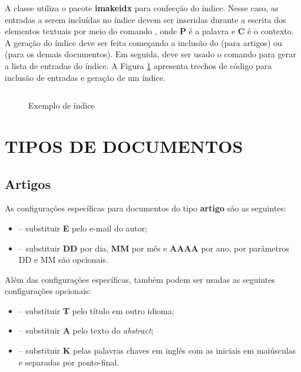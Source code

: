 \documentclass[artigo]{iftex2024}
\newcommand{\ElaboradoAutor}{Elaborado pelo autor, 2024.}
\begin{document}
A classe {\iftex} utiliza o pacote \textbf{imakeidx} para confecção do índice.
Nesse caso, as entradas a serem incluídas no índice devem ser inseridas durante a escrita dos elementos textuais por meio do comando , onde \textbf{P} é a palavra e \textbf{C} é o contexto.
A geração do índice deve ser feita começando a inclusão do  (para artigos) ou  (para os demais documentos).
Em seguida, deve ser usado o comando  para gerar a lista de entradas do índice.
A Figura \ref{fig:exemplo_indice} apresenta trechos de código para inclusão de entradas e geração de um índice.

\begin{figure}[!htb] \centering
\caption{Exemplo de índice} \label{fig:exemplo_indice}
\begin{varwidth}{\linewidth}
\inputminted{latex}{figuras/exemplo_indice.tex}
\vspace{-1em}
\legend{\ElaboradoAutor}
\end{varwidth}
\end{figure}

\section{TIPOS DE DOCUMENTOS}

\subsection{Artigos}

As configurações específicas para documentos do tipo \textbf{artigo} são as seguintes:
\begin{itemize}
  \item[]  -- substituir \textbf{E} pelo e-mail do autor;

  \item[]  -- substituir \textbf{DD} por dia, \textbf{MM} por mês e \textbf{AAAA} por ano, por parâmetros DD e MM são opcionais.
\end{itemize}

Além das configurações específicas, também podem ser usadas as seguintes configurações opcionais:
\begin{itemize}
  \item[]  -- substituir \textbf{T} pelo título em outro idioma;

  \item[]  -- substituir \textbf{A} pelo texto do \textit{abstract};

  \item[]  -- substituir \textbf{K} pelas palavras chaves em inglês com as iniciais em maiúsculas e separadas por ponto-final.
\end{itemize}
\end{document}
